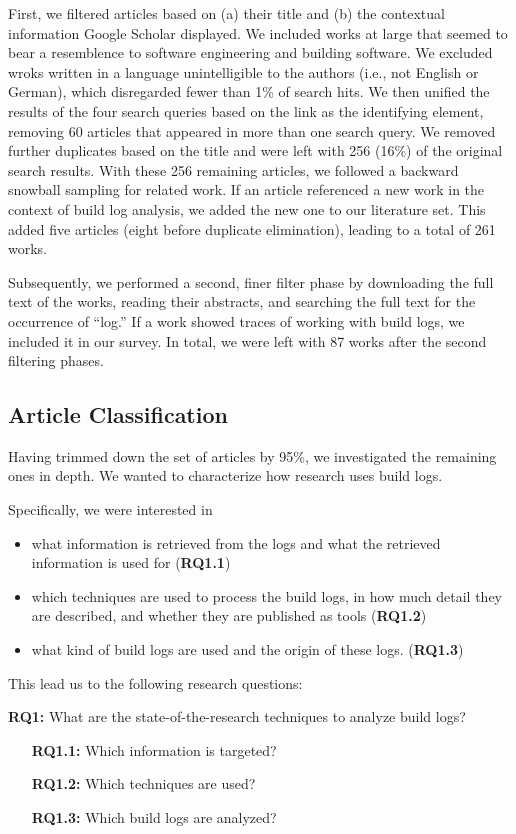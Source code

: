 First, we filtered articles based on (a) their title and (b) the
contextual information Google Scholar displayed.
We included works at large that seemed to bear a resemblence to software
engineering and building software.
We excluded wroks written in a language unintelligible to the authors
(i.e., not English or German), which disregarded fewer than 1\% of search
hits.
We then unified
the results of the four search queries based on the link as the
identifying element, removing 60 articles that appeared in more than
one search query.
We removed further duplicates based on the title and were
left with 256 (16\%) of the original search results.
With these 256 remaining articles, we followed a backward snowball
sampling for related work.
If an article referenced a new work in the context
of build log analysis, we added the new one to our literature set.
This added five articles (eight before
duplicate elimination), leading to a total of 261
works.


Subsequently, we performed a second, finer filter phase by downloading the
full text of the works, reading their abstracts, and searching the
full text
for the occurrence of ``log.''
If a work showed traces of
working with build logs, we included it in our survey.
In total, we
were left with 87 works after the second filtering phases.

\subsection{Article Classification}
Having trimmed down the set of articles by 95\%, we investigated the
remaining ones in depth.
We wanted to characterize how research uses build logs.

Specifically, we were interested in
\begin{itemize}
  \item what information is retrieved from the logs and
  what the retrieved information is used for (\textbf{RQ1.1})
  \item which techniques are used to process the build logs,
  in how much detail they are described, and whether they are published
  as tools (\textbf{RQ1.2})
  \item what kind of build logs are used and the origin of these
  logs.
(\textbf{RQ1.3})
\end{itemize}

This lead us to the following research questions:
\begin{simplebox}[attach boxed title to top center={yshift=-6mm}]
{\textbf{RQ1:} What are the state-of-the-research
techniques to analyze build logs?}
\begin{itemize}[leftmargin=2cm]
  \item[\textbf{RQ1.1:}] Which information is targeted?
  \item[\textbf{RQ1.2:}] Which techniques are used?
  \item[\textbf{RQ1.3:}] Which build logs are analyzed?
\end{itemize}
\end{simplebox}

